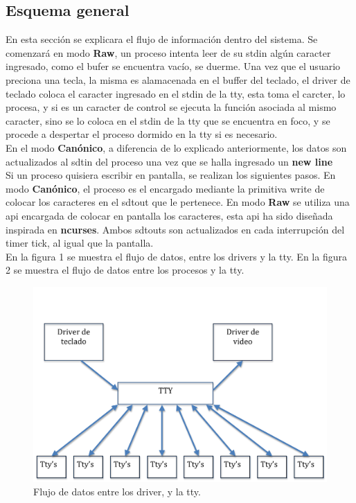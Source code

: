 \documentclass[10pt,a4paper]{article}
\begin{document}
	\subsection{Esquema general}
En esta secci\'on se explicara el flujo de informaci\'on dentro del sistema. Se comenzar\'a en modo \textbf{Raw}, un proceso intenta leer de su stdin alg\'un caracter ingresado, como el bufer se encuentra vac\'io, se duerme. Una vez que el usuario preciona una tecla, la misma es alamacenada en el buffer del teclado, el driver de teclado coloca el caracter ingresado en el stdin de la tty, esta toma el carcter, lo procesa, y si es un caracter de control se ejecuta la funci\'on asociada al mismo caracter, sino se lo coloca en el stdin de la tty que se encuentra en foco, y se procede a despertar el proceso dormido en la tty si es necesario.\\
		En el modo \textbf{Can\'onico}, a diferencia de lo explicado anteriormente, los datos son actualizados al sdtin del proceso una vez que se halla ingresado un \textbf{new line}\\
		Si un proceso quisiera escribir en pantalla, se realizan los siguientes pasos. En modo \textbf{Can\'onico}, el proceso es el encargado mediante la primitiva write de colocar los caracteres en el sdtout que le pertenece. En modo  \textbf{Raw} se utiliza una api encargada de colocar en pantalla los caracteres, esta api ha sido dise\~nada inspirada en \textbf{ncurses}. Ambos sdtouts son actualizados en cada interrupci\'on del timer tick, al igual que la pantalla.\\
		 
		En la figura 1 se muestra el flujo de datos, entre los drivers y la tty. En la figura 2 se muestra el flujo de datos entre los procesos y la tty. \\
	\begin{figure}
	\begin{center} 
	\includegraphics[angle=0, width=1\textwidth , height=0.3\textheight]{flujoTTY.png} 
	\caption{ Flujo de datos entre los driver, y la tty. }
	\end{center} 
	\end{figure}
	
\end{document}
